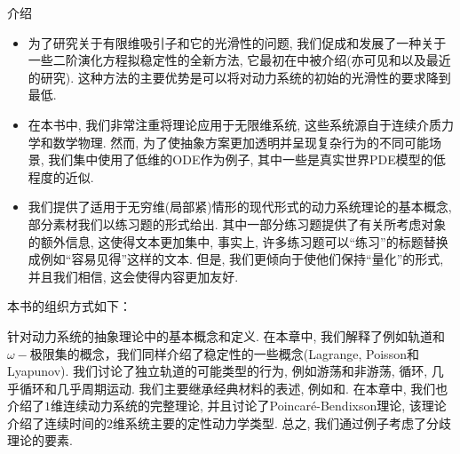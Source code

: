 \begin{PreChapter}{介\quad 绍}
\begin{itemize}
		\item 为了研究关于有限维吸引子和它的光滑性的问题, 我们促成和发展了一种关于一些二阶演化方程拟稳定性的全新方法, 它最初在\cite{Chueshov04}中被介绍(亦可见\cite{Chueshov08}和\cite{Chueshov10}以及最近的研究\cite{Chueshov13}). 这种方法的主要优势是可以将对动力系统的初始的光滑性的要求降到最低. 
		
		\item 在本书中, 我们非常注重将理论应用于无限维系统, 这些系统源自于连续介质力学和数学物理. 然而, 为了使抽象方案更加透明并呈现复杂行为的不同可能场景, 我们集中使用了低维的ODE作为例子, 其中一些是真实世界PDE模型的低程度的近似. 
		
		\item 我们提供了适用于无穷维(局部紧)情形的现代形式的动力系统理论的基本概念, 部分素材我们以练习题的形式给出. 其中一部分练习题提供了有关所考虑对象的额外信息, 这使得文本更加集中, 事实上, 许多练习题可以“练习”的标题替换成例如“容易见得”这样的文本. 但是, 我们更倾向于使他们保持“量化”的形式, 并且我们相信, 这会使得内容更加友好. 
	\end{itemize}

	本书的组织方式如下：
	
	针对动力系统的抽象理论中的基本概念和定义. 在本章中, 我们解释了例如轨道和$\omega-$极限集的概念，我们同样介绍了稳定性的一些概念(Lagrange, Poisson和Lyapunov). 我们讨论了独立轨道的可能类型的行为, 例如游荡和非游荡, 循环, 几乎循环和几乎周期运动. 我们主要继承经典材料的表述, 例如\cite{Nemytskii60}和\cite{Sibirsky75}. 在本章中, 我们也介绍了$1$维连续动力系统的完整理论, 并且讨论了Poincaré-Bendixson理论, 该理论介绍了连续时间的$2$维系统主要的定性动力学类型. 总之, 我们通过例子考虑了分歧理论的要素. 

\end{PreChapter}